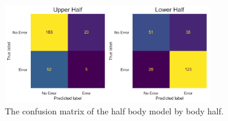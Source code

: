 \begin{figure}[htbp]
  \centering
  \includegraphics[width=0.8\textwidth]{figures/Results/v2/confusion/body_halves_half.png}
  \caption[Half Body Confusion Matrix by Body Half]{The confusion matrix of the half body model by body half.}
  \label{fig:conf_v2_hb}
\end{figure}



